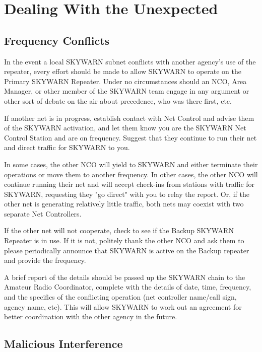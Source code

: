 \documentclass[pdflatex,letterpaper,twoside,12pt]{book}
\begin{document}
\section{Dealing With the Unexpected}

\subsection{Frequency Conflicts}

In the event a local SKYWARN subnet conflicts with another agency's use of the repeater, every effort should be made to allow SKYWARN to operate on the Primary SKYWARN Repeater.  Under no circumstances should an NCO, Area Manager, or other member of the SKYWARN team engage in any argument or other sort of debate on the air about precedence, who was there first, etc. 

If another net is in progress, establish contact with Net Control and advise them of the SKYWARN activation, and let them know you are the SKYWARN Net Control Station and are on frequency.  Suggest that they continue to run their net and direct traffic for SKYWARN to you. 

In some cases, the other NCO will yield to SKYWARN and either terminate their operations or move them to another frequency.  In other cases, the other NCO will continue running their net and will accept check-ins from stations with traffic for SKYWARN, requesting they "go direct" with you to relay the report.  Or, if the other net is generating relatively little traffic, both nets may coexist with two separate Net Controllers. 

If the other net will not cooperate, check to see if the Backup SKYWARN Repeater is in use. If it is not, politely thank the other NCO and ask them to please periodically announce that SKYWARN is active on the Backup repeater and provide the frequency. 

A brief report of the details should be passed up the SKYWARN chain to the Amateur Radio Coordinator, complete with the details of date, time, frequency, and the specifics of the conflicting operation (net controller name/call sign, agency name, etc).  This will allow SKYWARN to work out an agreement for better coordination with the other agency in the future.

\subsection{Malicious Interference}
\end{document}
